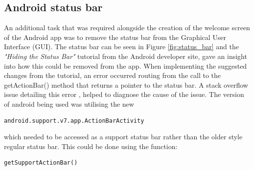 \subsection{Android status bar}


\begin{figure}[h!]
\end{figure}


An additional task that was required alongside the creation of the welcome screen of the Android app was to remove the status bar from the Graphical User Interface (GUI). The status bar can be seen in Figure \ref{fig:status_bar} and the \textit{"Hiding the Status Bar"} tutorial \cite{hide_status_bar} from the Android developer site, gave an insight into how this could be removed from the app. When implementing the suggested changes from the tutorial, an error occurred routing from the call to the getActionBar() method that returns a pointer to the status bar. A stack overflow issue detailing this error \cite{sof_status_bar_err}, helped to diagnose the cause of the issue. The version of android being used was utilising the new
\begin{verbatim}
android.support.v7.app.ActionBarActivity
\end{verbatim}
which needed to be accessed as a support status bar rather than the older style regular status bar. This could be done using the function: 
\begin{verbatim}
getSupportActionBar()
\end{verbatim}

